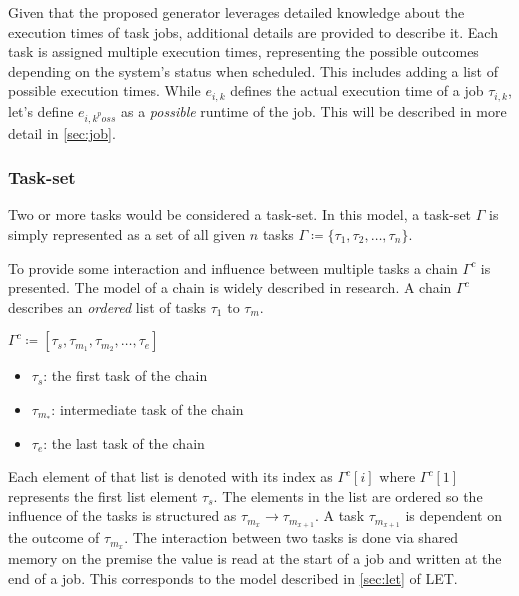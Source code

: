 Given that the proposed generator leverages detailed knowledge about the execution times of task jobs, additional details are provided to describe it. 
Each task is assigned multiple execution times, representing the possible outcomes depending on the system's status when scheduled. This includes adding a list of possible execution times.
While $e_{i,k}$ defines the actual execution time of a job $\tau_{i,k}$\cite{buttazzoHardRealTimeComputing2024}, let's define $e_{{i,k}^poss}$ as a \textit{possible} runtime of the job.
This will be described in more detail in \cref{sec:job}.

\subsubsection{Task-set}\label{sec:taskset}
Two or more tasks would be considered a task-set.
In this model, a task-set $\Gamma$ is simply represented as a set of all given $n$ tasks $\Gamma \coloneqq \{\tau_1, \tau_2, \ldots, \tau_n\}$.

To provide some interaction and influence between multiple tasks a chain $\Gamma^c$ is presented.
The model of a chain is widely described in research\cite{
beckerSynthesizingJoblevelDependencies2016,abdullahWorstcaseCauseeffectReaction2019,choiChainBasedFixedPriorityScheduling2020}.
A chain $\Gamma^c$ describes an \textit{ordered} list of tasks $\tau_1$ to $\tau_m$.
\begin{center}
	$\Gamma^c \coloneqq [\tau_s,\tau_{m_1},\tau_{m_2}, \ldots, \tau_e]$
\end{center}
\begin{itemize}
	\item $\tau_s$: the first task of the chain
	\item $\tau_{m_*}$: intermediate task of the chain
	\item $\tau_e$: the last task of the chain
\end{itemize}
Each element of that list is denoted with its index as $\Gamma^c[i]$ where $\Gamma^c[1]$ represents the first list element $\tau_s$\cite{choiChainBasedFixedPriorityScheduling2020}.
The elements in the list are ordered so the influence of the tasks is structured as $\tau_{m_x} \rightarrow \tau_{m_{x+1}}$.
A task $\tau_{m_{x+1}}$ is dependent on the outcome of $ \tau_{m_{x}}$.
The interaction between two tasks is done via shared memory on the premise the value is read at the start of a job and written at the end of a job\cite{choiChainBasedFixedPriorityScheduling2020}.
This corresponds to the model described in \cref{sec:let} of \ac{LET}.

